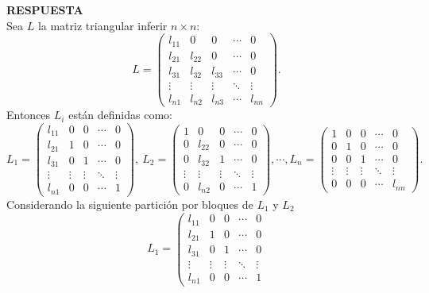 \documentclass[11pt,letterpaper]{article}
\newcommand{\res}{\textbf{RESPUESTA}\\}
\begin{document}
\begin{enumerate}
\res
Sea $L$ la matriz triangular inferir $n\times n$:
\begin{equation*}
L=\left( \begin{array}{ccccc}
l_{11}&0 & 0 & \cdots &0\\
l_{21}&l_{22}& 0 & \cdots & 0\\
l_{31}&l_{32}& l_{33}& \cdots & 0\\
\vdots & \vdots & \vdots & \ddots & \vdots\\
l_{n1}&l_{n2}&l_{n3}& \cdots & l_{nn}
\end{array}\right).
\end{equation*}	 
Entonces $L_i$ están definidas como:
\begin{equation*}
L_1=\left( \begin{array}{ccccc}
l_{11}&0 & 0 & \cdots &0\\
l_{21}&1& 0 & \cdots & 0\\
l_{31}&0&1& \cdots & 0\\
\vdots & \vdots & \vdots & \ddots & \vdots\\
l_{n1}&0&0& \cdots &1
\end{array}\right), \ L_2=\left( \begin{array}{ccccc}
1&0 & 0 & \cdots &0\\
0&l_{22}& 0 & \cdots & 0\\
0&l_{32}& 1& \cdots & 0\\
\vdots & \vdots & \vdots & \ddots & \vdots\\
0&l_{n2}&0& \cdots & 1
\end{array}\right), \cdots , L_n=\left( \begin{array}{ccccc}
1&0 & 0 & \cdots &0\\
0&1& 0 & \cdots & 0\\
0&0& 1& \cdots & 0\\
\vdots & \vdots & \vdots & \ddots & \vdots\\
0&0&0& \cdots & l_{nn}
\end{array}\right).
\end{equation*}
Considerando la siguiente partición por bloques de $L_1$ y $L_2$
\begin{equation*}
L_1=\left( \begin{array}{c|cccc}
l_{11}&0 & 0 & \cdots &0\\ \hline
l_{21}&1& 0 & \cdots & 0\\
l_{31}&0&1& \cdots & 0\\
\vdots & \vdots & \vdots & \ddots & \vdots\\
l_{n1}&0&0& \cdots &1

\end{array}
\end{equation*}
\end{enumerate}
\end{document}
